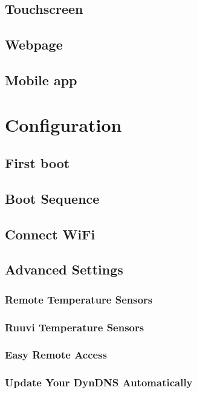 \documentclass{article}
\begin{document}
\subsection{Touchscreen} \label{Touchscreen}

\subsection{Webpage} \label{Webpage}

\subsection{Mobile app}


\section{Configuration}
\subsection{First boot}

\subsection{Boot Sequence}

\subsection{Connect WiFi}

\subsection{Advanced Settings}
\subsubsection{Remote Temperature Sensors} \label{Remote Temperature Sensors}

\subsubsection{Ruuvi Temperature Sensors} \label{Ruuvi Temperature Sensors}

\subsubsection{Easy Remote Access}

\subsubsection{Update Your DynDNS Automatically}

\end{document}

